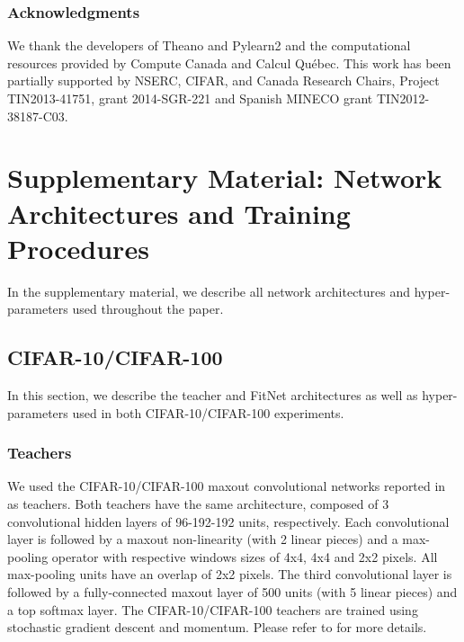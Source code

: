 \documentclass{article} %
\begin{document}
\subsubsection*{Acknowledgments}
\vspace*{-1mm}

We thank the developers of Theano
\citep{Bastien-2012} and Pylearn2 \citep{pylearn2_arxiv_2013} and the computational resources provided by Compute Canada and Calcul Qu\'ebec. This work has been partially supported by NSERC, CIFAR, and Canada Research Chairs, Project TIN2013-41751, grant 2014-SGR-221 and Spanish MINECO grant TIN2012-38187-C03.

\vspace*{-0mm}

{\small

}

\newpage
\appendix

\section{Supplementary Material: Network Architectures and Training Procedures}

In the supplementary material, we describe all network architectures and hyper-parameters used throughout the paper.

\subsection{CIFAR-10/CIFAR-100}
\label{sec:cifar10}

In this section, we describe the teacher and FitNet architectures as well as hyper-parameters used in both CIFAR-10/CIFAR-100 experiments.

\subsubsection{Teachers}
We used the CIFAR-10/CIFAR-100 maxout convolutional networks reported in~\citet{Goodfellow13} as teachers. Both teachers have the same architecture, composed of 3 convolutional hidden layers of 96-192-192 units, respectively. Each convolutional layer is followed by a maxout non-linearity (with 2 linear pieces) and a max-pooling operator with respective windows sizes of 4x4, 4x4 and 2x2 pixels. All max-pooling units have an overlap of 2x2 pixels. The third convolutional layer is followed by a fully-connected maxout layer of 500 units (with 5 linear pieces) and a top softmax layer. The CIFAR-10/CIFAR-100 teachers  are trained using stochastic gradient descent and momentum. Please refer to \citet{Goodfellow13} for more details.
\end{document}
